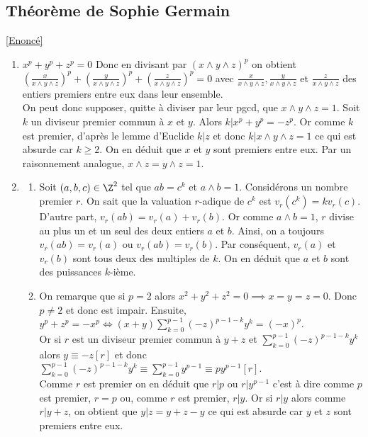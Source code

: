 \documentclass[8pt]{book}
\begin{document}
	\subsection{Théorème de Sophie Germain }
	\label{Théorème de Sophie Germain corrigé}
	\textcolor{blue}{\hyperref[Théorème de Sophie Germain]{[Enoncé]}}\\
	\begin{enumerate}[leftmargin=*]
		\item $x^p+y^p+z^p=0$ Donc en divisant par $(x\wedge y\wedge z)^p$ on obtient $\displaystyle\left(\frac{x}{x\wedge y\wedge z}\right)^p+\left(\frac{y}{x\wedge y\wedge z}\right)^p+\left(\frac{z}{x\wedge y\wedge z}\right)^p=0$ avec $\displaystyle\frac{x}{x\wedge y\wedge z},\frac{y}{x\wedge y\wedge z}$ et $\displaystyle\frac{z}{x\wedge y\wedge z}$ des entiers premiers entre eux dans leur ensemble.\\
		On peut donc supposer, quitte à diviser par leur pgcd, que $x\wedge y\wedge z=1$. Soit $k$ un diviseur premier commun à $x$ et $y$. Alors $k|x^p+y^p=-z^p$. Or comme $k$ est premier, d'après le lemme d'Euclide $k|z$ et donc $k|x\wedge y\wedge z=1$ ce qui est absurde car $k\geq 2$. On en déduit que $x$ et $y$ sont premiers entre eux. Par un raisonnement analogue, $x\wedge z=y\wedge z=1$.
		\item \begin{enumerate}[label=\alph*.]
			\item Soit $(a,b,c)\in \Z^2$ tel que $ab=c^k$ et $a\wedge b=1$. Considérons un nombre premier $r$. On sait que la valuation $r$-adique de $c^k$ est $v_r(c^k)=kv_r(c)$. D'autre part, $v_r(ab)=v_r(a)+v_r(b)$. Or comme $a\wedge b=1$, $r$ divise au plus un et un seul des deux entiers $a$ et $b$. Ainsi, on a toujours $v_r(ab)=v_r(a)$ ou $v_r(ab)=v_r(b)$. Par conséquent, $v_r(a)$ et $v_r(b)$ sont tous deux des multiples de $k$. On en déduit que $a$ et $b$ sont des puissances $k$-ième.
			\item On remarque que si $p=2$ alors $x^2+y^2+z^2=0\implies x=y=z=0$. Donc $p\ne 2$ et donc est impair. Ensuite, $y^p+z^p=-x^p\iff (x+y)\displaystyle\sum_{k=0}^{p-1}(-z)^{p-1-k}y^k=(-x)^p$.\\
			Or si $r$ est un diviseur premier commun à $y+z$ et $\displaystyle\sum_{k=0}^{p-1}(-z)^{p-1-k}y^k$ alors $y\equiv-z[r]$ et donc $\displaystyle\sum_{k=0}^{p-1}(-z)^{p-1-k}y^k\equiv \sum_{k=0}^{p-1}y^{p-1}\equiv py^{p-1}[r]$.\\
			Comme $r$ est premier on en déduit que $r|p$ ou $r|y^{p-1}$ c'est à dire comme $p$ est premier, $r=p$ ou, comme $r$ est premier, $r|y$. Or si $r|y$ alors comme $r|y+z$, on obtient que $y|z=y+z-y$ ce qui est absurde car $y$ et $z$ sont premiers entre eux.\\

\end{enumerate}
\end{enumerate}
\end{document}
